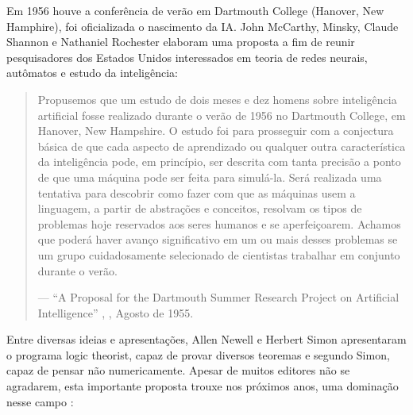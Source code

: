 \documentclass[
]{book}
\begin{document}
Em 1956 houve a conferência de verão em Dartmouth College (Hanover, New Hamphire), foi oficializada o nascimento da IA. John McCarthy, Minsky, Claude Shannon e Nathaniel Rochester elaboram uma proposta a fim de reunir pesquisadores dos Estados Unidos interessados em teoria de redes neurais, autômatos e estudo da inteligência:

\begin{quote}
Propusemos que um estudo de dois meses e dez homens sobre inteligência artificial fosse realizado durante o verão de 1956 no Dartmouth College, em Hanover, New Hampshire. O estudo foi para prosseguir com a conjectura básica de que cada aspecto de aprendizado ou qualquer outra característica da inteligência pode, em princípio, ser descrita com tanta precisão a ponto de
que uma máquina pode ser feita para simulá-la. Será realizada uma tentativa para descobrir como fazer com que as máquinas usem a linguagem, a partir de abstrações e conceitos, resolvam os tipos
de problemas hoje reservados aos seres humanos e se aperfeiçoarem. Achamos que poderá haver avanço significativo em um ou mais desses problemas se um grupo cuidadosamente selecionado de cientistas trabalhar em conjunto durante o verão.

--- ``A Proposal for the Dartmouth Summer Research Project on Artificial Intelligence'' , \citet{mccarthy2006proposal} , Agosto de 1955.
\end{quote}

Entre diversas ideias e apresentações, Allen Newell e Herbert Simon apresentaram o programa logic theorist, capaz de provar diversos teoremas e segundo Simon, capaz de pensar não numericamente. Apesar de muitos editores não se agradarem, esta importante proposta trouxe nos próximos anos, uma dominação nesse campo \citep{russel2004inteligencia}:
\end{document}
